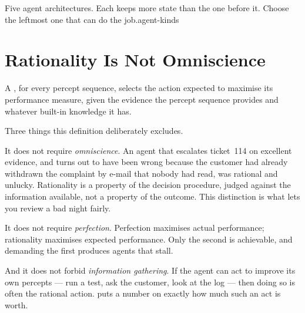 {}%
{Five agent architectures. Each keeps more state than the one before it. Choose the
leftmost one that can do the job.}{agent-kinds}

\section{Rationality Is Not Omniscience}

A , for every percept sequence, selects the action expected to
maximise its performance measure, given the evidence the percept sequence provides
and whatever built-in knowledge it has.

Three things this definition deliberately excludes.

It does not require \emph{omniscience}. An agent that escalates ticket~114 on
excellent evidence, and turns out to have been wrong because the customer had
already withdrawn the complaint by e-mail that nobody had read, was rational and
unlucky. Rationality is a property of the decision procedure, judged against the
information available, not a property of the outcome. This distinction is what
lets you review a bad night fairly.

It does not require \emph{perfection}. Perfection maximises actual performance;
rationality maximises expected performance. Only the second is achievable, and
demanding the first produces agents that stall.

And it does not forbid \emph{information gathering}. If the agent can act to
improve its own percepts --- run a test, ask the customer, look at the log --- then
doing so is often the rational action.  puts a number on
exactly how much such an act is worth.

